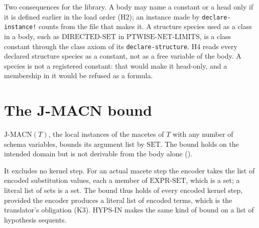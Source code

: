 Two consequences for the library.  A body may name a
constant or a head only if it is defined earlier in the load order
(H2); an instance made by \texttt{declare-instance!} counts from the file
that makes it.  A structure species used as a class in a body, such as
$\mathrm{DIRECTED\text{-}SET}$ in $\mathrm{PTWISE\text{-}NET\text{-}LIMITS}$,
is a class constant through the class axiom of its
\texttt{declare-structure}.  H4 reads every declared structure species
as a constant, not as a free variable of the body.  A species is not a
registered constant: that would make it head-only, and a membership in
it would be refused as a formula.

\section{The J-MACN bound}

$\mathrm{J\text{-}MACN}(T)$, the local instances of the macetes of $T$
with any number of schema variables, bounds its argument list by
$\mathrm{SET}$.  The bound holds on the intended domain but is not
derivable from the body alone ().

It excludes no kernel step.  For an actual macete step the encoder takes
the list of encoded substitution values, each a member of
$\mathrm{EXPR\text{-}SET}$, which is a set; a literal list of sets is a
set.  The bound thus holds of every encoded kernel step, provided the
encoder produces a literal list of encoded terms, which is the
translator's obligation (K3).  $\mathrm{HYPS\text{-}IN}$ makes the same
kind of bound on a list of hypothesis sequents.
